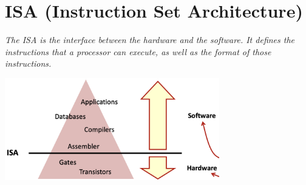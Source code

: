\section{ISA (Instruction Set Architecture)}
\textit{The ISA is the interface between the hardware and the software. It defines the instructions that a processor can execute, as well as the format of those instructions.} \newline
\begin{center}
    \includegraphics[width=0.7\textwidth]{chapters/chapter1/images/isa.png}
    \centering
\end{center}